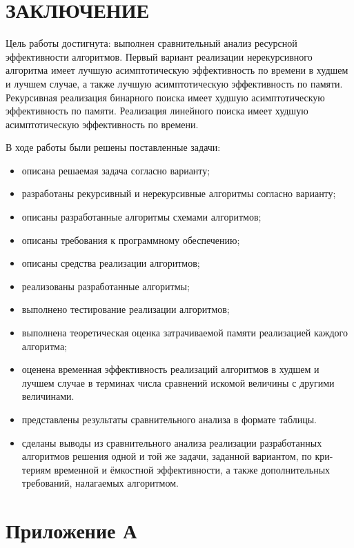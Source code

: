 \documentclass{bmstu}
\begin{document}
\chapter*{ЗАКЛЮЧЕНИЕ}
Цель работы достигнута: выполнен сравнительный анализ ресурсной эффективности
алгоритмов. Первый вариант реализации нерекурсивного алгоритма имеет лучшую
асимптотическую эффективность по времени в худшем и лучшем случае,
а также лучшую асимптотическую эффективность по памяти. Рекурсивная реализация
бинарного поиска имеет худшую асимптотическую эффективность по памяти.
Реализация линейного поиска имеет худшую асимптотическую эффективность по времени.

В ходе работы были решены поставленные задачи:
\begin{itemize}
	\item описана решаемая задача согласно варианту;
	\item разработаны рекурсивный и нерекурсивные алгоритмы согласно варианту;
	\item описаны разработанные алгоритмы схемами алгоритмов;
	\item описаны требования к программному обеспечению;
	\item описаны средства реализации алгоритмов;
	\item реализованы разработанные алгоритмы;
	\item выполнено тестирование реализации алгоритмов;
	\item выполнена теоретическая оценка затрачиваемой памяти реализацией каждого алгоритма;
	\item оценена временная эффективность реализаций алгоритмов в худшем и лучшем
	      случае в терминах числа сравнений искомой величины с другими величинами.
	\item представлены результаты сравнительного анализа в формате таблицы.
	\item сделаны выводы из сравнительного анализа реализации разработанных
	      алгоритмов решения одной и той же задачи, заданной вариантом, по кри-
	      териям временной и ёмкостной эффективности, а также дополнительных
	      требований, налагаемых алгоритмом.
\end{itemize}

\makebibliography

\appendix
\chapter*{Приложение А}








\end{document}
